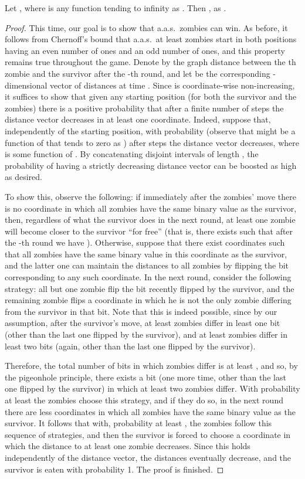 \documentclass[12pt]{amsart}
\begin{document}
\begin{lemma}\label{lemm2}
Let , where  is any function tending to infinity as . Then , as .
\end{lemma}
\begin{proof}
This time, our goal is to show that a.a.s.\  zombies can win. As before, it follows from Chernoff's bound that a.a.s.\ at least  zombies start in both positions having an even number of ones
and an odd number of ones, and this property remains true throughout the game. Denote by  the graph distance between the th zombie and the survivor after the -th round, and let
 be the corresponding -dimensional vector of distances at time . Since  is coordinate-wise non-increasing, it suffices to show that given any starting position (for both the survivor
and the zombies) there is a positive probability that after a finite number of steps the distance vector decreases in at least one coordinate. Indeed, suppose that, independently of the starting
position, with probability  (observe that  might be a function of  that tends to zero as ) after  steps the distance vector decreases, where  is some function of . By concatenating disjoint intervals of length , the probability
of having a strictly decreasing distance vector can be boosted as high as desired.

To show this, observe the following: if immediately after the zombies' move there is no coordinate in which all zombies have the same binary value as the survivor, then, regardless of what the survivor
does in the next round, at least one zombie will become closer to the survivor ``for free'' (that is, there exists  such that after the -th round we have ).
Otherwise, suppose that there exist  coordinates such that all zombies have the same binary value in this coordinate as the survivor, and the latter one can maintain the distances to all
zombies by flipping the bit corresponding to any such coordinate. In the next round, consider the following strategy: all but one zombie flip the bit recently flipped by the survivor, and the
remaining zombie flips a coordinate in which he is not the only zombie differing from the survivor in that bit. Note that this is indeed possible, since by our assumption, after the survivor's
move, at least  zombies differ in least one bit (other than the last one flipped by the survivor), and at least  zombies differ in least two bits (again, other than the last one flipped by
the survivor). 

Therefore, the total number of bits in which zombies differ is at least , and so, by the pigeonhole principle, there exists a bit (one more time, other than the last one flipped by
the survivor) in which at least two zombies differ. With probability at least  the zombies choose this strategy, and if they do so, in the next round there are less coordinates in which
all zombies have the same binary value as the survivor. It follows that with, probability at least , the zombies follow this sequence of strategies, and then the survivor is forced to
choose a coordinate in which the distance to at least one zombie decreases.  Since this holds independently of the distance vector, the distances eventually decrease, and the survivor is eaten with
probability 1. The proof is finished.
\end{proof}
\end{document}
